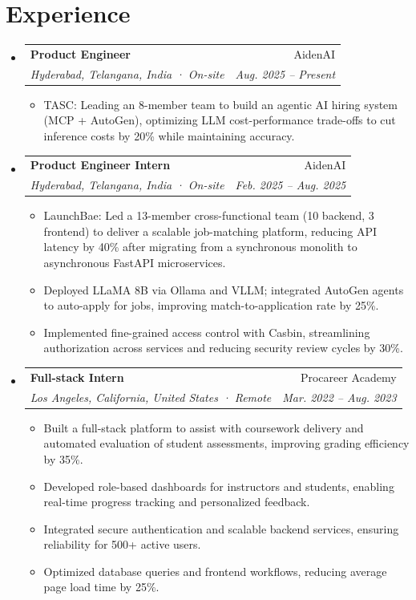\documentclass[letterpaper,11pt]{article}
\makeatletter
\newcommand{\resumeItem}[1]{
  \item\small{
    {#1 \vspace{-2pt}}
  }
}
\newcommand{\resumeSubheading}[4]{
  \vspace{-2pt}\item
    \begin{tabular*}{0.97\textwidth}[t]{l@{\extracolsep{\fill}}r}
      \textbf{#1} & #2 \\
      \textit{\small#3} & \textit{\small #4} \\
    \end{tabular*}\vspace{-7pt}
}
\newcommand{\resumeSubHeadingListStart}{\begin{itemize}[leftmargin=0.15in, label={}]}
\newcommand{\resumeSubHeadingListEnd}{\end{itemize}}
\newcommand{\resumeItemListStart}{\begin{itemize}}
\newcommand{\resumeItemListEnd}{\end{itemize}\vspace{-5pt}}
\makeatother
\begin{document}
\section{\textcolor{blue(pigment)}{Experience}}
  \resumeSubHeadingListStart
    \resumeSubheading
      {Product Engineer}{AidenAI}
      {Hyderabad, Telangana, India · On-site}{Aug. 2025 -- Present}
      \resumeItemListStart
        \resumeItem{TASC: Leading an 8-member team to build an agentic AI hiring system (MCP + AutoGen), optimizing LLM cost-performance trade-offs to cut inference costs by 20\% while maintaining accuracy.}
      \resumeItemListEnd
    
    \resumeSubheading
      {Product Engineer Intern}{AidenAI}
      {Hyderabad, Telangana, India · On-site}{Feb. 2025 -- Aug. 2025}
      \resumeItemListStart
        \resumeItem{LaunchBae: Led a 13-member cross-functional team (10 backend, 3 frontend) to deliver a scalable job-matching platform, reducing API latency by 40\% after migrating from a synchronous monolith to asynchronous FastAPI microservices.}
        \resumeItem{Deployed LLaMA 8B via Ollama and VLLM; integrated AutoGen agents to auto-apply for jobs, improving match-to-application rate by 25\%.}
        \resumeItem{Implemented fine-grained access control with Casbin, streamlining authorization across services and reducing security review cycles by 30\%.}
      \resumeItemListEnd

        \resumeSubheading
      {Full-stack Intern}{Procareer Academy}
      {Los Angeles, California, United States · Remote}{Mar. 2022 -- Aug. 2023}
      \resumeItemListStart
        \resumeItem{Built a full-stack platform to assist with coursework delivery and automated evaluation of student assessments, improving grading efficiency by 35\%.}
        \resumeItem{Developed role-based dashboards for instructors and students, enabling real-time progress tracking and personalized feedback.}
        \resumeItem{Integrated secure authentication and scalable backend services, ensuring reliability for 500+ active users.}
        \resumeItem{Optimized database queries and frontend workflows, reducing average page load time by 25\%.}
      \resumeItemListEnd
  \resumeSubHeadingListEnd

\end{document}

